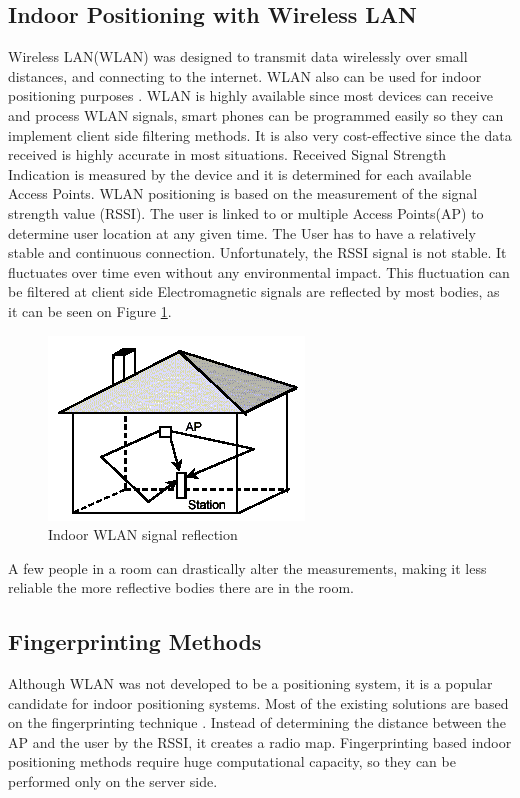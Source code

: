 \subsection{Indoor Positioning with Wireless LAN}
	Wireless LAN(WLAN) was designed to transmit data wirelessly over small distances, and connecting to the internet. WLAN also can be used for indoor positioning purposes \cite{evennou2006advanced}. WLAN is highly available since most devices can receive and process WLAN signals, smart phones can be programmed easily so they can implement client side filtering methods. It is also very cost-effective since the data received is highly accurate in most situations. Received Signal Strength Indication is measured by the device and it is determined for each available Access Points.
	 WLAN positioning is based on the measurement of the signal strength value (RSSI). The user  is linked to or multiple Access Points(AP) to determine user location at any given time. The User has to have a relatively stable and continuous connection. Unfortunately, the RSSI signal is not stable. It fluctuates over time even without any environmental impact. This fluctuation can be filtered at client side Electromagnetic signals are reflected \cite{kjaergaard2012mobile} by most bodies, as it can be seen on Figure \ref{fig:kockahaz}.
	\begin{figure}[h]
		\centering
		\includegraphics[width=.3\linewidth]{figures/Reflect.png}
		\caption{Indoor WLAN signal reflection \cite{Reflections}}\label{fig:kockahaz}
	\end{figure}
	 A few people in a room can drastically alter the measurements, making it less reliable the more reflective bodies there are in the room. 

\subsection{Fingerprinting Methods}
	Although WLAN was not developed to be a positioning system, it is a popular candidate for indoor positioning systems.  Most of the existing solutions are based on the fingerprinting technique \cite{kaemarungsi2004properties,honkavirta2009comparative}. Instead of determining the distance between the AP and the user by the  RSSI, it creates a radio map. Fingerprinting based indoor positioning methods require huge computational capacity, so they can be performed only on the server side.
	

